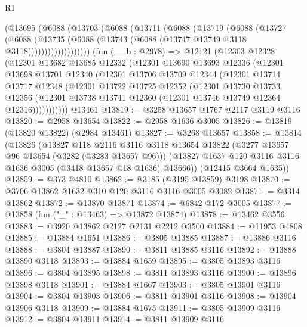 \begin{lexlean}{R1}
\begin{coremodule}
            (@13695
              (@6088
                (@13703
                  (@6088
                    (@13711
                      (@6088
                        (@13719
                          (@6088
                            (@13727
                              (@6088
                                (@13735
                                  (@6088
                                    (@13743 (@6088 (@13747 @13749 @3118 @3118)))))))))))))))))))
    (fun (__b : @2978) =>
    @12121
      (@12303
        @12328
        (@12301
          @13682
          @13685
          @12332
          (@12301
            @13690
            @13693
            @12336
            (@12301
              @13698
              @13701
              @12340
              (@12301
                @13706
                @13709
                @12344
                (@12301
                  @13714
                  @13717
                  @12348
                  (@12301
                    @13722
                    @13725
                    @12352
                    (@12301
                      @13730
                      @13733
                      @12356
                      (@12301 @13738 @13741 @12360 (@12301 @13746 @13749 @12364 @12316)))))))))))
    @13461
@13819 := @3258 @13657 @1767 @2117 @3119 @3116
@13820 := @2958 @13654
@13822 := @2958 @1636 @3005
@13826 := @13819 (@13820 @13822) (@2984 @13461)
@13827 := @3268 @13657
@13858 := @13814
    (@13826
      (@13827
        @118
        @2116
        @3116
        @3118
        @13654
        @13822
        (@3277 @13657 @96 @13654 (@3282 (@3283 @13657 @96)))
        (@13827 @1637 @120 @3116 @3116 @1636 @3005 (@3418 @13657 @18 @1636) @13666))
      (@12415 @3664 @1635))
@13859 := @373 @4810
@13862 := @3185 (@3195 @13859) @3198
@13870 := @3706 @13862 @1632 @310 @120 @3116 @3116 @3005 @3082
@13871 := @3314 @13862
@13872 := @13870 @13871
@13874 := @6842 @172 @3005
@13877 := @13858 (fun ("_" : @13463) => @13872 @13874)
@13878 := @13462 @3556
@13883 := @3920 @13862 @2127 @2131 @2212 @3500
@13884 := @11953 @4808
@13885 := @13884 @1651
@13886 := @3805 @13885
@13887 := @13886 @3116
@13888 := @3804 @13887
@13890 := @3811 @13885 @3116
@13892 := @13888 @13890 @3118
@13893 := @13884 @1659
@13895 := @3805 @13893 @3116
@13896 := @3804 @13895
@13898 := @3811 @13893 @3116
@13900 := @13896 @13898 @3118
@13901 := @13884 @1667
@13903 := @3805 @13901 @3116
@13904 := @3804 @13903
@13906 := @3811 @13901 @3116
@13908 := @13904 @13906 @3118
@13909 := @13884 @1675
@13911 := @3805 @13909 @3116
@13912 := @3804 @13911
@13914 := @3811 @13909 @3116

\end{coremodule}
\end{lexlean}
